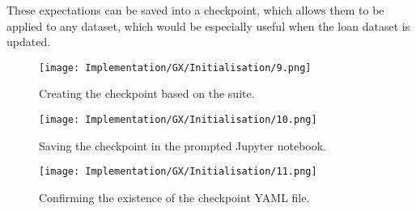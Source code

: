 \para These expectations can be saved into a checkpoint, which allows them to be applied to any dataset, which would be especially 
useful when the loan dataset is updated.

\begin{figure}[H]
    \centering
    \texttt{[image: Implementation/GX/Initialisation/9.png]}
    \caption{Creating the checkpoint based on the suite.}
    \label{fig:GXCheckpoint1}
\end{figure}

\begin{figure}[H]
    \centering
    \texttt{[image: Implementation/GX/Initialisation/10.png]}
    \caption{Saving the checkpoint in the prompted Jupyter notebook.}
    \label{fig:GXCheckpoint2}
\end{figure}

\begin{figure}[H]
    \centering
    \texttt{[image: Implementation/GX/Initialisation/11.png]}
    \caption{Confirming the existence of the checkpoint YAML file.}
    \label{fig:GXCheckpoint3}
\end{figure}

